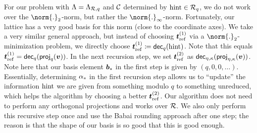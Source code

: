 \begin{remark}
For our problem with $\Lambda = \Lambda_{\mathcal{R},q}$ and $\mathcal{C}$ determined by $\mathrm{hint}\in\mathcal{R}_q$, we do not work over the $\norm{.}_2$-norm, but rather the $\norm{.}_\infty$-norm. Fortunately, our lattice has a very good basis for this norm (close to the coordinate axes). We take a very similar general approach, but instead of choosing $\boldsymbol{t}_{\mathrm{ref}}^{(1)}$ via a $\norm{.}_2$-minimization problem, we directly choose $\boldsymbol{t}_{\mathrm{ref}}^{(1)} \coloneqq \mathsf{dec}_{q}(\mathrm{hint})$. Note that this equals $\boldsymbol{t}_{\mathrm{ref}}^{(1)}=\mathsf{dec}_{q}(\mathsf{proj}_{q}(\boldsymbol{v}))$. In the next recursion step, we set $\boldsymbol{t}_{\mathrm{ref}}^{(2)}$ as $\mathsf{dec}_{\eta,\kappa}(\mathsf{proj}_{\eta,\kappa}(\boldsymbol{v}))$. Note here that our basis element $\boldsymbol{b}_{\ast}$ in the first step is given by $(q,0,0,\ldots)$. Essentially, determining $\alpha_{\ast}$ in the first recursion step allows us to ``update'' the information $\mathrm{hint}$ we are given from something modulo $q$ to something unreduced, which helps the algorithm by choosing a better $\boldsymbol{t}_{\mathrm{ref}}^{(2)}$.
Our algorithm does not need to perform any orthogonal projections and works over $\mathcal{R}$. We also only perform this recursive step once and use the Babai rounding approach after one step; the reason is that the shape of our basis is so good that this is good enough.






\end{remark}
